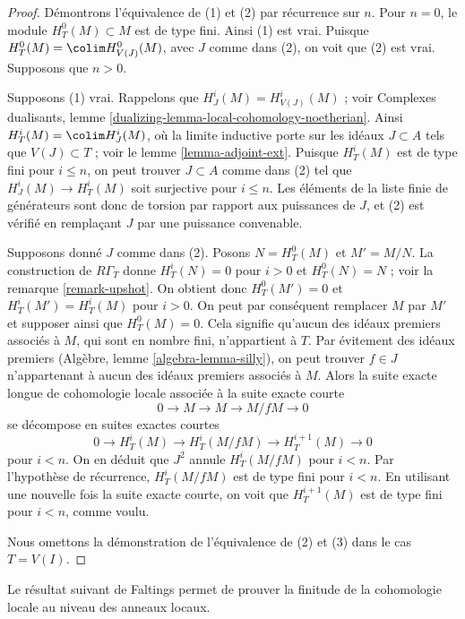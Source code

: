 \begin{proof}
Démontrons l'équivalence de (1) et (2) par récurrence sur $n$. Pour $n = 0$, le module $H^0_T(M) \subset M$ est de type fini. Ainsi (1) est vrai. Puisque $H^0_T(M) = \colim H^0_{V(J)}(M)$, avec $J$ comme dans (2), on voit que (2) est vrai. Supposons que $n > 0$.

\medskip\noindent
Supposons (1) vrai. Rappelons que $H^i_J(M) = H^i_{V(J)}(M)$ ; voir Complexes dualisants, lemme \ref{dualizing-lemma-local-cohomology-noetherian}. Ainsi $H^i_T(M) = \colim H^i_J(M)$, où la limite inductive porte sur les idéaux $J \subset A$ tels que $V(J) \subset T$ ; voir le lemme \ref{lemma-adjoint-ext}. Puisque $H^i_T(M)$ est de type fini pour $i \leq n$, on peut trouver $J \subset A$ comme dans (2) tel que $H^i_J(M) \to H^i_T(M)$ soit surjective pour $i \leq n$. Les éléments de la liste finie de générateurs sont donc de torsion par rapport aux puissances de $J$, et (2) est vérifié en remplaçant $J$ par une puissance convenable.

\medskip\noindent
Supposons donné $J$ comme dans (2). Posons $N = H^0_T(M)$ et $M' = M/N$. La construction de $R\Gamma_T$ donne $H^i_T(N) = 0$ pour $i > 0$ et $H^0_T(N) = N$ ; voir la remarque \ref{remark-upshot}. On obtient donc $H^0_T(M') = 0$ et $H^i_T(M') = H^i_T(M)$ pour $i > 0$. On peut par conséquent remplacer $M$ par $M'$ et supposer ainsi que $H^0_T(M) = 0$. Cela signifie qu'aucun des idéaux premiers associés à $M$, qui sont en nombre fini, n'appartient à $T$. Par évitement des idéaux premiers (Algèbre, lemme \ref{algebra-lemma-silly}), on peut trouver $f \in J$ n'appartenant à aucun des idéaux premiers associés à $M$. Alors la suite exacte longue de cohomologie locale associée à la suite exacte courte
$$
0 \to M \to M \to M/fM \to 0
$$
se décompose en suites exactes courtes
$$
0 \to H^i_T(M) \to H^i_T(M/fM) \to H^{i + 1}_T(M) \to 0
$$
pour $i < n$. On en déduit que $J^2$ annule $H^i_T(M/fM)$ pour $i < n$. Par l'hypothèse de récurrence, $H^i_T(M/fM)$ est de type fini pour $i < n$. En utilisant une nouvelle fois la suite exacte courte, on voit que $H^{i + 1}_T(M)$ est de type fini pour $i < n$, comme voulu.

\medskip\noindent
Nous omettons la démonstration de l'équivalence de (2) et (3) dans le cas $T = V(I)$.
\end{proof}

\noindent
Le résultat suivant de Faltings permet de prouver la finitude de la cohomologie locale au niveau des anneaux locaux.

